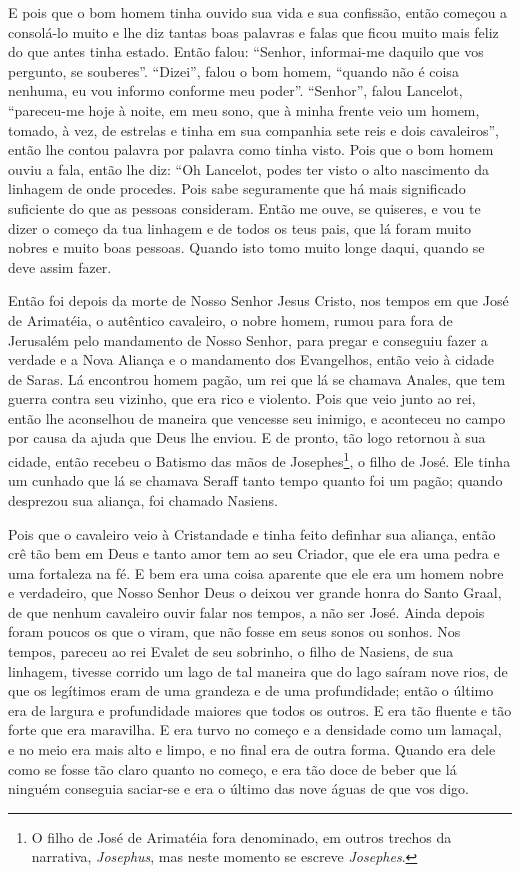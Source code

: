 E pois que o bom homem tinha ouvido sua vida e sua confissão, então começou
a consolá-lo muito e lhe diz tantas boas palavras e falas que ficou muito mais
feliz do que antes tinha estado. Então falou: “Senhor, informai-me daquilo que
vos pergunto, se souberes”. “Dizei”, falou o bom homem, “quando não é coisa
nenhuma, eu vou informo conforme meu poder”. “Senhor”, falou Lancelot,
“pareceu-me hoje à noite, em meu sono, que à minha frente veio um homem,
tomado, à vez, de estrelas e tinha em sua companhia sete reis e dois
cavaleiros”, então lhe contou palavra por palavra como tinha visto. Pois que o
bom homem ouviu a fala, então lhe diz: “Oh Lancelot, podes ter visto o alto
nascimento da linhagem de onde procedes. Pois sabe seguramente que há mais
significado suficiente do que as pessoas consideram. Então me ouve, se
quiseres, e vou te dizer o começo da tua linhagem e de todos os teus pais, que
lá foram muito nobres e muito boas pessoas. Quando isto tomo muito longe daqui,
quando se deve assim fazer.

Então foi depois da morte de Nosso Senhor Jesus Cristo, nos tempos em que
José de Arimatéia, o autêntico cavaleiro, o nobre homem, rumou para fora de
Jerusalém pelo mandamento de Nosso Senhor, para pregar e conseguiu fazer a
verdade e a Nova Aliança e o mandamento dos Evangelhos, então veio à cidade de
Saras. Lá encontrou homem pagão, um rei que lá se chamava Anales, que tem
guerra contra seu vizinho, que era rico e violento. Pois que veio junto ao rei,
então lhe aconselhou de maneira que vencesse seu inimigo, e aconteceu no campo
por causa da ajuda que Deus lhe enviou. E de pronto, tão logo retornou à sua
cidade, então recebeu o Batismo das mãos de Josephes\footnote{ O filho de José
de Arimatéia fora denominado, em outros trechos da narrativa,
\textit{Josephus}, mas neste momento se escreve \textit{Josephes}. 
}, o filho de José. Ele tinha um cunhado que lá se chamava Seraff tanto tempo
quanto foi um pagão; quando desprezou sua aliança, foi chamado Nasiens.

  Pois que o cavaleiro veio à Cristandade e tinha feito definhar sua
aliança, então crê tão bem em Deus e tanto amor tem ao seu Criador, que ele era
uma pedra e uma fortaleza na fé. E bem era uma coisa aparente que ele era um
homem nobre e verdadeiro, que Nosso Senhor Deus o deixou ver grande honra do
Santo Graal, de que nenhum cavaleiro ouvir falar nos tempos, a não ser José.
Ainda depois foram poucos os que o viram, que não fosse em seus sonos ou
sonhos. Nos tempos, pareceu ao rei Evalet de seu sobrinho, o filho de Nasiens,
de sua linhagem, tivesse corrido um lago de tal maneira que do lago saíram nove
rios, de que os legítimos eram de uma grandeza e de uma profundidade; então o
último era de largura e profundidade maiores que todos os outros. E era tão
fluente e tão forte que era maravilha. E era turvo no começo e a densidade como
um lamaçal, e no meio era mais alto e limpo, e no final era de outra forma.
Quando era dele como se fosse tão claro quanto no começo, e era tão doce de
beber que lá ninguém conseguia saciar-se e era o último das nove águas de que
vos digo.

